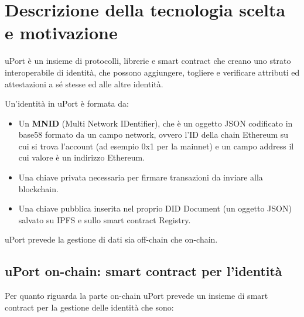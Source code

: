 \section{Descrizione della tecnologia scelta e motivazione}

uPort è un insieme di protocolli, librerie e smart contract che creano uno strato interoperabile di identità,
che possono aggiungere, togliere e verificare attributi ed attestazioni a sé stesse ed alle altre identità.

Un’identità in uPort è formata da:

\begin{itemize}
  \item Un \textbf{MNID} (Multi Network IDentifier), che è un oggetto JSON codificato in base58 formato da un campo network, ovvero l’ID della chain Ethereum su cui si trova l’account
  (ad esempio 0x1 per la mainnet) e un campo address il cui valore è un indirizzo Ethereum.
  \item Una chiave privata necessaria per firmare transazioni da inviare alla blockchain.
  \item Una chiave pubblica inserita nel proprio DID Document (un oggetto JSON) salvato su IPFS e sullo smart contract Registry.
\end{itemize}

uPort prevede la gestione di dati sia off-chain che on-chain. 

\subsection{uPort on-chain: smart contract per l'identità}

Per quanto riguarda la parte on-chain uPort prevede un insieme di smart contract per la gestione delle identità che sono:

